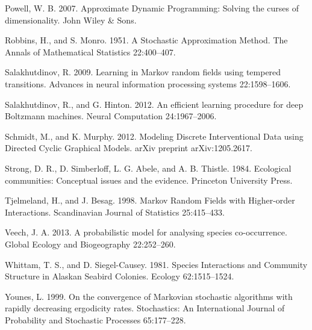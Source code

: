 \documentclass[12pt,]{article}
\begin{document}
\begin{spacing}{1.9}
\begin{flushleft}
Powell, W. B. 2007. Approximate Dynamic Programming: Solving the curses
of dimensionality. John Wiley \& Sons.

Robbins, H., and S. Monro. 1951. A Stochastic Approximation Method. The
Annals of Mathematical Statistics 22:400--407.

Salakhutdinov, R. 2009. Learning in Markov random fields using tempered
transitions. Advances in neural information processing systems
22:1598--1606.

Salakhutdinov, R., and G. Hinton. 2012. An efficient learning procedure
for deep Boltzmann machines. Neural Computation 24:1967--2006.

Schmidt, M., and K. Murphy. 2012. Modeling Discrete Interventional Data
using Directed Cyclic Graphical Models. arXiv preprint arXiv:1205.2617.

Strong, D. R., D. Simberloff, L. G. Abele, and A. B. Thistle. 1984.
Ecological communities: Conceptual issues and the evidence. Princeton
University Press.

Tjelmeland, H., and J. Besag. 1998. Markov Random Fields with
Higher-order Interactions. Scandinavian Journal of Statistics
25:415--433.

Veech, J. A. 2013. A probabilistic model for analysing species
co-occurrence. Global Ecology and Biogeography 22:252--260.

Whittam, T. S., and D. Siegel-Causey. 1981. Species Interactions and
Community Structure in Alaskan Seabird Colonies. Ecology 62:1515--1524.

Younes, L. 1999. On the convergence of Markovian stochastic algorithms
with rapidly decreasing ergodicity rates. Stochastics: An International
Journal of Probability and Stochastic Processes 65:177--228.
\end{flushleft}
\end{spacing}
\end{document}
